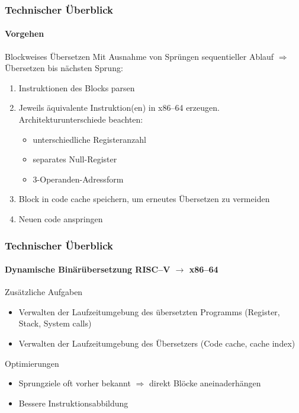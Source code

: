 \documentclass[aspectratio=169, sectionpage=false, german]{tumbeamer}
\newcommand{\conclude}[0]{\ensuremath{\Longrightarrow} }
\newcommand{\refer}[0]{\ensuremath{\rightarrow} }
\begin{document}
\begin{frame}
	\frametitle{Technischer Überblick}
	\framesubtitle {Vorgehen}
	\begin{block}{Blockweises Übersetzen}
		Mit Ausnahme von Sprüngen sequentieller Ablauf \conclude Übersetzen bis nächsten Sprung:
		\vspace{0.2cm}
		\begin{enumerate}
			\item Instruktionen des Blocks parsen
			\item Jeweils äquivalente Instruktion(en) in x86--64 erzeugen.\\
			Architekturunterschiede beachten:
			\begin{itemize}
				\item unterschiedliche Registeranzahl
				\item separates Null-Register
				\item 3-Operanden-Adressform
			\end{itemize}
			\item Block in code cache speichern, um erneutes Übersetzen zu vermeiden
			\item Neuen code anspringen
		\end{enumerate}
	\end{block}
\end{frame}

\begin{frame}
	\frametitle{Technischer Überblick}

	\framesubtitle {Dynamische Binärübersetzung RISC--V \refer x86--64}

	\begin{block}{Zusätzliche Aufgaben}
		\begin{itemize}
			\item Verwalten der Laufzeitumgebung des übersetzten Programms (Register, Stack, System calls)
			\item Verwalten der Laufzeitumgebung des Übersetzers (Code cache, cache index)
		\end{itemize}
	\end{block}
	\vspace{1cm}

	\begin{block}{Optimierungen}
		\begin{itemize}
			\item Sprungziele oft vorher bekannt \conclude direkt Blöcke aneinaderhängen
			\item Bessere Instruktionsabbildung
		\end{itemize}
	\end{block}
\end{frame}
\end{document}
